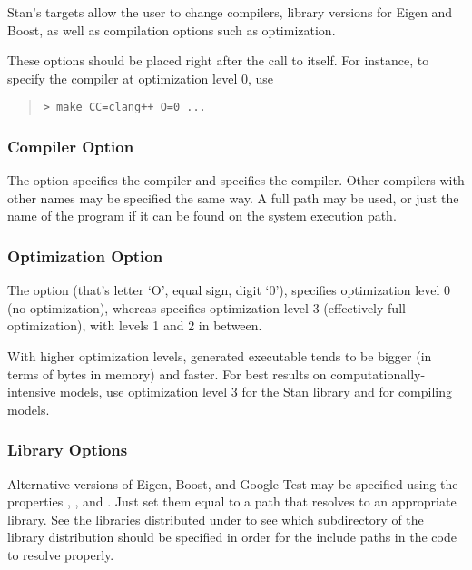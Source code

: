 Stan's  targets allow the user to change compilers,
library versions for Eigen and Boost, as well as compilation options
such as optimization.

These options should be placed right after the call to 
itself.  For instance, to specify the  compiler at
optimization level 0, use
%
\begin{quote}
\begin{Verbatim}[fontshape=sl,fontsize=\small]
> make CC=clang++ O=0 ...
\end{Verbatim}
\end{quote}


\subsubsection{Compiler Option}

The option  specifies the  compiler and
 specifies the  compiler.  Other
compilers with other names may be specified the same way.  A full path
may be used, or just the name of the program if it can be found on the
system execution path.  

\subsubsection{Optimization Option}

The option  (that's letter `O', equal sign, digit `0'),
specifies optimization level 0 (no optimization), whereas 
specifies optimization level 3 (effectively full optimization), with
levels 1 and 2 in between.

With higher optimization levels, generated executable tends to be bigger
(in terms of bytes in memory) and faster.  For best results on
computationally-intensive models, use optimization level 3 for the
Stan library and for compiling models.

\subsubsection{Library Options}

Alternative versions of Eigen, Boost, and Google Test may be specified
using the properties , , and .
Just set them equal to a path that resolves to an appropriate library.
See the libraries distributed under  to see which
subdirectory of the library distribution should be specified in order
for the include paths in the \Cpp code to resolve properly.


